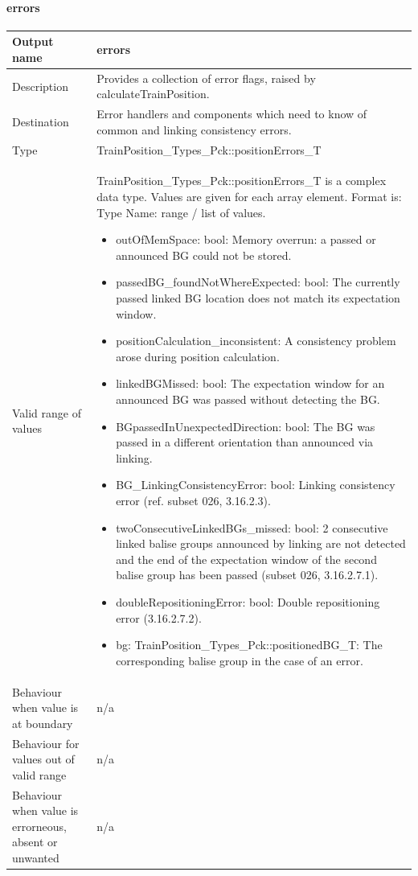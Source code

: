 \paragraph{errors}

\begin{longtable}{p{}p{}}
\toprule
Output name				& errors \\
\midrule
Description				& Provides a collection of error flags, raised by calculateTrainPosition.   \\
\midrule
Destination				& Error handlers and components which need to know of common and linking consistency errors.  \\ 
\midrule
Type					& TrainPosition\_Types\_Pck::positionErrors\_T \\  
\midrule
Valid range of values	& TrainPosition\_Types\_Pck::positionErrors\_T is a complex data type. Values are given for each array element. Format is: Type Name: range / list of values.
\begin{itemize}
\item outOfMemSpace: bool: Memory overrun: a passed or announced BG could not be stored.
\item passedBG\_foundNotWhereExpected: bool: The currently passed linked BG location does not match its expectation window.
\item positionCalculation\_inconsistent: A consistency problem arose during position calculation.
\item linkedBGMissed: bool: The expectation window for an announced BG was passed without detecting the BG.
\item BGpassedInUnexpectedDirection: bool: The BG was passed in a different orientation than announced via linking.
\item BG\_LinkingConsistencyError: bool: Linking consistency error (ref. subset 026, 3.16.2.3).
\item twoConsecutiveLinkedBGs\_missed: bool: 2 consecutive linked balise groups announced by linking are not detected and the end of the expectation window of the second balise group has been passed (subset 026, 3.16.2.7.1).
\item doubleRepositioningError: bool: Double repositioning error (3.16.2.7.2).
\item bg: TrainPosition\_Types\_Pck::positionedBG\_T: The corresponding balise group in the case of an error.
\end{itemize}  \\
\midrule
Behaviour when value is at boundary		& n/a \\
\midrule
Behaviour for values out of valid range	& n/a \\
\midrule
Behaviour when value is errorneous, absent or unwanted & n/a \\
\bottomrule
\end{longtable}


